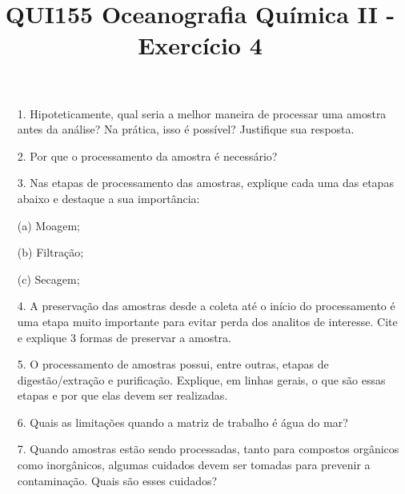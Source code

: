 \documentclass[a4paper,10pt]{article}
\title{QUI155 Oceanografia Química II - Exercício 4}
\author{\vspace{-10ex}}
\date{\vspace{-10ex}}
\begin{document}
  \maketitle
  \onehalfspace

  \begin{itemize}
  
    \item[1.] Hipoteticamente, qual seria a melhor maneira de processar uma amostra antes da análise? Na prática, isso é possível? Justifique sua resposta.
    
    \item[2.] Por que o processamento da amostra é necessário?
    
    \item[3.] Nas etapas de processamento das amostras, explique cada uma das etapas abaixo e destaque a sua importância:
      \item[(a)] Moagem;
      \item[(b)] Filtração;
      \item[(c)] Secagem;
    
    \item[4.] A preservação das amostras desde a coleta até o início do processamento é uma etapa muito importante para evitar perda dos analitos de interesse. Cite e explique 3 formas de preservar a amostra.
    
    \item[5.] O processamento de amostras possui, entre outras, etapas de digestão/extração e purificação. Explique, em linhas gerais, o que são essas etapas e por que elas devem ser realizadas.
    
    \item[6.] Quais as limitações quando a matriz de trabalho é água do mar? 
    
    \item[7.] Quando amostras estão sendo processadas, tanto para compostos orgânicos como inorgânicos, algumas cuidados devem ser tomadas para prevenir a  contaminação. Quais são esses cuidados?
  
  \end{itemize}


\end{document}
